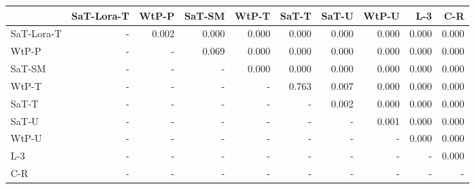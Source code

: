 \begin{tabular}{lrrrrrrrrr}
\toprule
 & SaT-Lora-T & WtP-P & SaT-SM & WtP-T & SaT-T & SaT-U & WtP-U & L-3 & C-R \\
\midrule
SaT-Lora-T & - & 0.002 & 0.000 & 0.000 & 0.000 & 0.000 & 0.000 & 0.000 & 0.000 \\
WtP-P & - & - & 0.069 & 0.000 & 0.000 & 0.000 & 0.000 & 0.000 & 0.000 \\
SaT-SM & - & - & - & 0.000 & 0.000 & 0.000 & 0.000 & 0.000 & 0.000 \\
WtP-T & - & - & - & - & 0.763 & 0.007 & 0.000 & 0.000 & 0.000 \\
SaT-T & - & - & - & - & - & 0.002 & 0.000 & 0.000 & 0.000 \\
SaT-U & - & - & - & - & - & - & 0.001 & 0.000 & 0.000 \\
WtP-U & - & - & - & - & - & - & - & 0.000 & 0.000 \\
L-3 & - & - & - & - & - & - & - & - & 0.000 \\
C-R & - & - & - & - & - & - & - & - & - \\
\bottomrule
\end{tabular}


